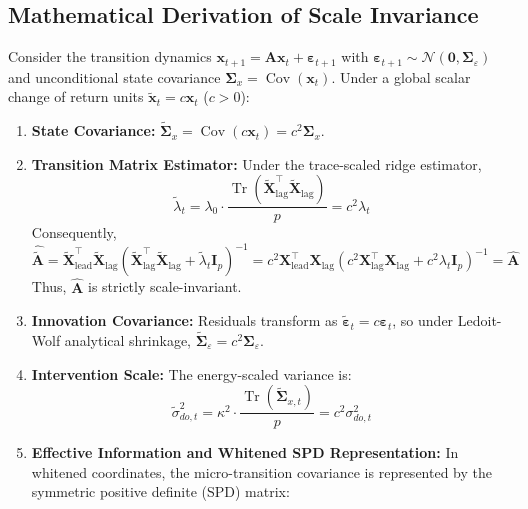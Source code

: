 \documentclass[12pt]{article}
\begin{document}
\subsection{Mathematical Derivation of Scale Invariance}
Consider the transition dynamics $\mathbf{x}_{t+1} = \mathbf{A}\mathbf{x}_t + \boldsymbol{\varepsilon}_{t+1}$ with $\boldsymbol{\varepsilon}_{t+1} \sim \mathcal{N}(\mathbf{0}, \boldsymbol{\Sigma}_\varepsilon)$ and unconditional state covariance $\boldsymbol{\Sigma}_x = \operatorname{Cov}(\mathbf{x}_t)$. Under a global scalar change of return units $\tilde{\mathbf{x}}_t = c \mathbf{x}_t$ ($c > 0$):
\begin{enumerate}
    \item \textbf{State Covariance:} $\tilde{\boldsymbol{\Sigma}}_x = \operatorname{Cov}(c \mathbf{x}_t) = c^2 \boldsymbol{\Sigma}_x$.
    \item \textbf{Transition Matrix Estimator:} Under the trace-scaled ridge estimator,
    \begin{equation}
    \tilde{\lambda}_t = \lambda_0 \cdot \frac{\operatorname{Tr}(\tilde{\mathbf{X}}_{\text{lag}}^\top \tilde{\mathbf{X}}_{\text{lag}})}{p} = c^2 \lambda_t
    \end{equation}
    Consequently,
    \begin{equation}
    \hat{\tilde{\mathbf{A}}} = \tilde{\mathbf{X}}_{\text{lead}}^\top \tilde{\mathbf{X}}_{\text{lag}} \left( \tilde{\mathbf{X}}_{\text{lag}}^\top \tilde{\mathbf{X}}_{\text{lag}} + \tilde{\lambda}_t \mathbf{I}_p \right)^{-1} = c^2 \mathbf{X}_{\text{lead}}^\top \mathbf{X}_{\text{lag}} \left( c^2 \mathbf{X}_{\text{lag}}^\top \mathbf{X}_{\text{lag}} + c^2 \lambda_t \mathbf{I}_p \right)^{-1} = \hat{\mathbf{A}}
    \end{equation}
    Thus, $\hat{\mathbf{A}}$ is strictly scale-invariant.
    \item \textbf{Innovation Covariance:} Residuals transform as $\tilde{\boldsymbol{\varepsilon}}_t = c \boldsymbol{\varepsilon}_t$, so under Ledoit-Wolf analytical shrinkage, $\tilde{\boldsymbol{\Sigma}}_\varepsilon = c^2 \boldsymbol{\Sigma}_\varepsilon$.
    \item \textbf{Intervention Scale:} The energy-scaled variance is:
    \begin{equation}
    \tilde{\sigma}_{do,t}^2 = \kappa^2 \cdot \frac{\operatorname{Tr}(\tilde{\boldsymbol{\Sigma}}_{x,t})}{p} = c^2 \sigma_{do,t}^2
    \end{equation}
    \item \textbf{Effective Information and Whitened SPD Representation:} In whitened coordinates, the micro-transition covariance is represented by the symmetric positive definite (SPD) matrix:

\end{enumerate}
\end{document}
